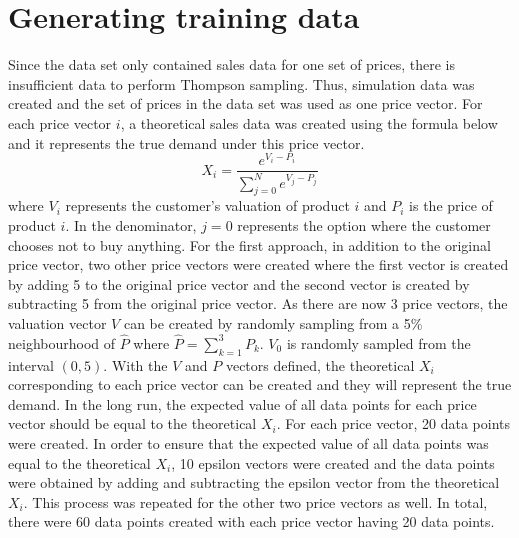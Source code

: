 \documentclass[a4paper]{article}
\begin{document}
\section{Generating training data}
\label{sec:theory}
Since the data set only contained sales data for one set of prices, there is insufficient data to perform Thompson sampling. Thus, simulation data was created and the set of prices in the data set was used as one price vector. 
\newline
\newline
For each price vector $i$, a theoretical sales data was created using the formula below and it represents the true demand under this price vector.
\[X_i = \frac{e^{V_i - P_i}}{\sum_{j=0}^{N}e^{V_j - P_j}} \tag{1}\]
where $V_i$ represents the customer's valuation of product $i$ and $P_i$ is the price of product $i$. In the denominator, $j=0$ represents the option where the customer chooses not to buy anything. For the first approach, in addition to the original price vector, two other price vectors were created where the first vector is created by adding 5 to the original price vector and the second vector is created by subtracting 5 from the original price vector. 
\newline
\newline
As there are now 3 price vectors, the valuation vector $V$ can be created by randomly sampling from a 5\% neighbourhood of $\hat{P}$ where $\hat{P}=\sum_{k=1}^{3}P_k$. $V_0$ is randomly sampled from the interval $(0,5).$
\newline
\newline
With the $V$ and $P$ vectors defined, the theoretical $X_i$ corresponding to each price vector can be created and they will represent the true demand. In the long run, the expected value of all data points for each price vector should be equal to the theoretical $X_i$.
\newline
\newline
For each price vector, 20 data points were created. In order to ensure that the expected value of all data points was equal to the theoretical $X_i$, 10 epsilon vectors were created and the data points were obtained by adding and subtracting the epsilon vector from the theoretical $X_i$. This process was repeated for the other two price vectors as well. In total, there were 60 data points created with each price vector having 20 data points.
\end{document}
